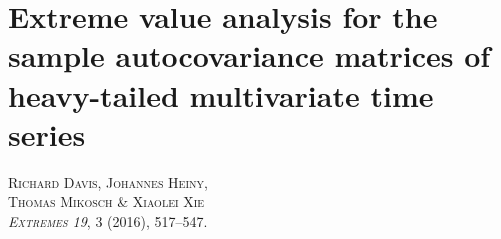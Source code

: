 \chapter[Extreme value analysis for the sample autocovariance matrices of heavy-tailed multivariate time series]{{\huge Extreme value analysis for the sample autocovariance matrices of heavy-tailed multivariate time series}}\label{ch:extremes}

\begin{center}
\textsc{Richard Davis, Johannes Heiny, \\Thomas Mikosch \& Xiaolei Xie\\
{\em Extremes 19}, 3 (2016), 517--547.}
\end{center}


